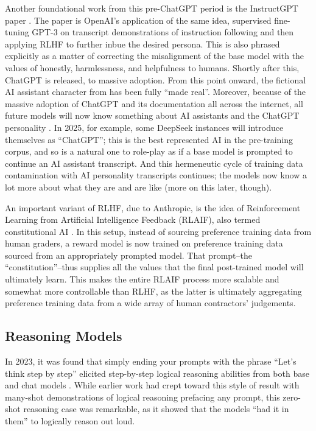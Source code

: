 Another foundational work from this pre-ChatGPT period is the InstructGPT paper
\cite{ouyang2022feedback}. The paper is OpenAI's application of the same idea,
supervised fine-tuning GPT-3 on transcript demonstrations of instruction
following and then applying RLHF to further inbue the desired persona. This is
also phrased explicitly as a matter of correcting the misalignment of the base
model with the values of honestly, harmlessness, and helpfulness to humans.
Shortly after this, ChatGPT is released, to massive adoption. From this point
onward, the fictional AI assistant character from \cite{askell2021assistant}
has been fully ``made real''. Moreover, because of the massive adoption of
ChatGPT and its documentation all across the internet, all future models will
now know something about AI assistants and the ChatGPT personality
\cite{nostalgebraist2025void}. In 2025, for example, some DeepSeek instances
\cite{deepseekai2025deepseek} will introduce themselves as ``ChatGPT''; this is
the best represented AI in the pre-training corpus, and so is a natural one to
role-play as if a base model is prompted to continue an AI assistant
transcript. And this hermeneutic cycle of training data contamination with AI
personality transcripts continues; the models now know a lot more about what
they are and are like (more on this later, though).

An important variant of RLHF, due to Anthropic, is the idea of Reinforcement
Learning from Artificial Intelligence Feedback (RLAIF), also termed
constitutional AI \cite{bai2022constitutional}. In this setup, instead of
sourcing preference training data from human graders, a reward model is now
trained on preference training data sourced from an appropriately prompted
model. That prompt--the ``constitution''--thus supplies all the values that the
final post-trained model will ultimately learn. This makes the entire RLAIF
process more scalable and somewhat more controllable than RLHF, as the latter
is ultimately aggregating preference training data from a wide array of human
contractors' judgements.

\subsection{Reasoning Models}
In 2023, it was found that simply ending your prompts with the phrase ``Let's
think step by step'' elicited step-by-step logical reasoning abilities from
both base and chat models \cite{kojima2023zeroshot}. While earlier work had
crept toward this style of result with many-shot demonstrations of logical
reasoning prefacing any prompt, this zero-shot reasoning case was remarkable,
as it showed that the models ``had it in them'' to logically reason out loud.

